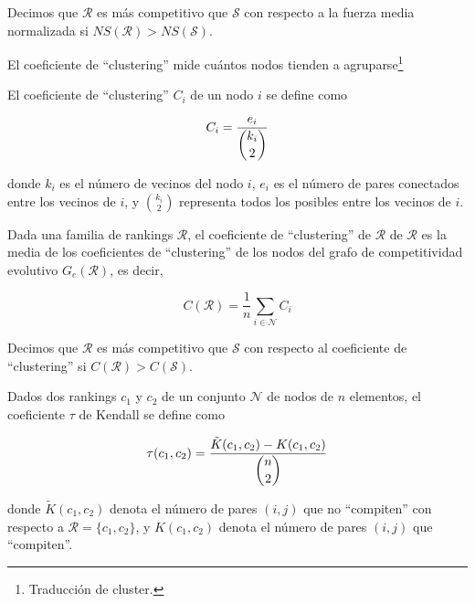 \begin{defi}
Decimos que $\mathcal{R}$ es más competitivo que $\mathcal{S}$ con respecto a la fuerza media normalizada si $NS(\mathcal{R}) > NS(\mathcal{S})$.
\end{defi}

\begin{nota}
El coeficiente de ``clustering'' mide cuántos nodos tienden a agruparse\footnote{Traducción de cluster.}
\end{nota}

\begin{defi}
El coeficiente de ``clustering'' $C_i$ de un nodo $i$ se define como 

\[ C_i = \dfrac{e_i}{\dbinom{k_i}{2}} \]

donde $k_i$ es el número de vecinos del nodo $i$, $e_i$ es el número de pares conectados entre los vecinos de $i$, y $\binom{k_i}{2}$ representa todos los posibles entre los vecinos de $i$.
\end{defi}

\begin{defi}
Dada una familia de rankings $\mathcal{R}$, el coeficiente de ``clustering'' de $\mathcal{R}$ de $\mathcal{R}$ es la media de los coeficientes de ``clustering'' de los nodos del grafo de competitividad evolutivo $G_e(\mathcal{R})$, es decir,

\[ C(\mathcal{R}) = \dfrac{1}{n} \sum_{i \in \mathcal{N}} C_i \]
\end{defi}

\begin{defi}
Decimos que $\mathcal{R}$ es más competitivo que $\mathcal{S}$ con respecto al coeficiente de ``clustering'' si $C(\mathcal{R}) > C(\mathcal{S})$.
\end{defi}

\begin{defi}
Dados dos rankings $c_1$ y $c_2$ de un conjunto $\mathcal{N}$ de nodos de $n$ elementos, el coeficiente $\tau$ de Kendall se define como

\[ \tau(c_1, c_2) = \dfrac{\tilde{K}(c_1, c_2) - K(c_1, c_2)}{\dbinom{n}{2}} \]

donde $\tilde{K}(c_1, c_2)$ denota el número de pares $(i,j)$ que no ``compiten'' con respecto a $\mathcal{R} = \{c_1, c_2\}$, y $K(c_1, c_2)$ denota el número de pares $(i,j)$ que ``compiten''. 
\end{defi}

